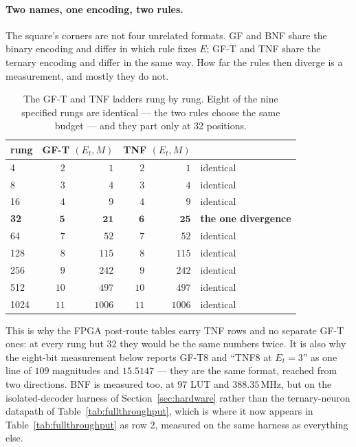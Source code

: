 \documentclass[11pt]{article}
\theoremstyle{definition}
\begin{document}
\paragraph{Two names, one encoding, two rules.} The square's corners are not
four unrelated formats. GF and BNF share the binary encoding and differ in which
rule fixes $E$; GF-T and TNF share the ternary encoding and differ in the same
way. How far the rules then diverge is a measurement, and mostly they do not.

\begin{table}[t]\centering
\caption{The GF-T and TNF ladders rung by rung. Eight of the nine specified
rungs are identical --- the two rules choose the same budget --- and they part
only at 32 positions.}
\label{tab:gftvstnf}
\begin{tabular}{lrrrrl}
\toprule
rung & \multicolumn{2}{c}{GF-T $(E_t, M)$} & \multicolumn{2}{c}{TNF $(E_t, M)$} & \\
\midrule
4    & $2$ & $1$    & $2$ & $1$    & identical \\
8    & $3$ & $4$    & $3$ & $4$    & identical \\
16   & $4$ & $9$    & $4$ & $9$    & identical \\
\textbf{32} & $\mathbf{5}$ & $\mathbf{21}$ & $\mathbf{6}$ & $\mathbf{25}$ & \textbf{the one divergence} \\
64   & $7$ & $52$   & $7$ & $52$   & identical \\
128  & $8$ & $115$  & $8$ & $115$  & identical \\
256  & $9$ & $242$  & $9$ & $242$  & identical \\
512  & $10$ & $497$ & $10$ & $497$ & identical \\
1024 & $11$ & $1006$& $11$ & $1006$& identical \\
\bottomrule
\end{tabular}
\end{table}

This is why the FPGA post-route tables carry TNF rows and no separate GF-T ones: at
every rung but 32 they would be the same numbers twice. It is also why the
eight-bit measurement below reports GF-T8 and ``TNF8 at $E_t=3$'' as one line
of $109$ magnitudes and $15.5147$ --- they are the same format, reached from two
directions. BNF is measured too, at $97$ LUT and $388.35$\,MHz, but on the
isolated-decoder harness of Section~\ref{sec:hardware} rather than the
ternary-neuron datapath of Table~\ref{tab:fullthroughput}, which is where
it now appears in Table~\ref{tab:fullthroughput} as row 2, measured on the
same harness as everything else.
\end{document}
